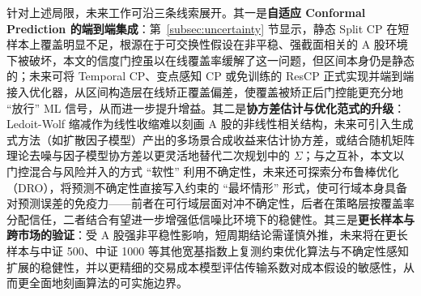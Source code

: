 针对上述局限，未来工作可沿三条线索展开。其一是\textbf{自适应 Conformal Prediction 的端到端集成}：第~\ref{subsec:uncertainty} 节显示，静态 Split CP 在短样本上覆盖明显不足，根源在于可交换性假设在非平稳、强截面相关的 A 股环境下被破坏，本文的信度门控虽以在线覆盖率缓解了这一问题，但区间本身仍是静态的；未来可将 Temporal CP\cite{Aydin2025TCP}、变点感知 CP\cite{Sun2025CPTC} 或免训练的 ResCP\cite{Neglia2026ResCP} 正式实现并端到端接入优化器，从区间构造层在线矫正覆盖偏差，使覆盖被矫正后门控能更充分地 ``放行'' ML 信号，从而进一步提升增益。其二是\textbf{协方差估计与优化范式的升级}：Ledoit-Wolf 缩减作为线性收缩难以刻画 A 股的非线性相关结构，未来可引入生成式方法（如扩散因子模型）产出的多场景合成收益来估计协方差，或结合随机矩阵理论去噪与因子模型协方差以更灵活地替代二次规划中的 $\Sigma$；与之互补，本文以门控混合与风险并入的方式 ``软性'' 利用不确定性，未来还可探索分布鲁棒优化（DRO），将预测不确定性直接写入约束的 ``最坏情形'' 形式，使可行域本身具备对预测误差的免疫力——前者在可行域层面对冲不确定性，后者在策略层按覆盖率分配信任，二者结合有望进一步增强低信噪比环境下的稳健性。其三是\textbf{更长样本与跨市场的验证}：受 A 股强非平稳性影响，短周期结论需谨慎外推，未来将在更长样本与中证 500、中证 1000 等其他宽基指数上复测约束优化算法与不确定性感知扩展的稳健性，并以更精细的交易成本模型评估传输系数对成本假设的敏感性，从而更全面地刻画算法的可实施边界。
